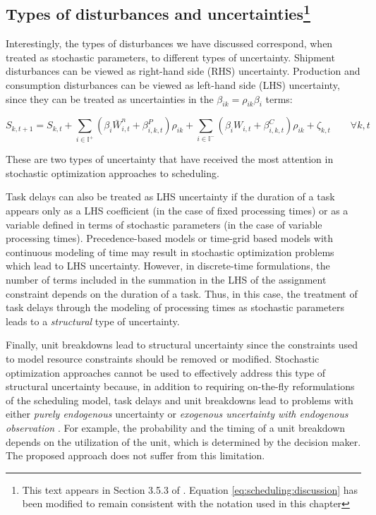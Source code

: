 \subsection{Types of disturbances and uncertainties\footnote{This text appears in Section 3.5.3 of
  \citet{subramanian:maravelias:rawlings:2012}. Equation
  \eqref{eq:scheduling:discussion} has been modified to remain
  consistent with the notation used in this chapter}}

Interestingly, the types of disturbances we have discussed
correspond, when treated as stochastic parameters, to different types
of uncertainty. Shipment disturbances can be viewed as right-hand side
(RHS) uncertainty. Production and consumption disturbances can be
viewed as left-hand side (LHS) uncertainty, since they can be treated
as uncertainties in the $\beta_{ik} = \rho_{ik}\beta_i$ terms:

\begin{equation}
\label{eq:scheduling:discussion}
S_{k,t+1} = S_{k,t}+ \sum_{i \in
  \mathbb{I}^+}(\beta_{i}\bar{W}_{i,t}^{n}+\beta_{i,k,t}^P)\rho_{ik}
+\sum_{i \in
  \mathbb{I}^-}(\beta_{i}{W}_{i,t}+\beta_{i,k,t}^C)\rho_{ik} +
\zeta_{k,t} \qquad \forall k,t
\end{equation}

These are two types of uncertainty that have received the most
attention in stochastic optimization approaches to scheduling.

Task delays can also be treated as LHS uncertainty if the duration of
a task appears only as a LHS coefficient (in the case of fixed
processing times) or as a variable defined in terms of stochastic
parameters (in the case of variable processing
times). Precedence-based models or time-grid based models with
continuous modeling of time may result in stochastic optimization
problems which lead to LHS uncertainty. However, in discrete-time
formulations, the number of terms included in the summation in the LHS
of the assignment constraint depends on the duration of a task. Thus,
in this case, the treatment of task delays through the modeling of
processing times as stochastic parameters leads to a
{\emph{structural}} type of uncertainty.

Finally, unit breakdowns lead to structural uncertainty since the
constraints used to model resource constraints should be removed or
modified. Stochastic optimization approaches cannot be used to
effectively address this type of structural uncertainty because, in
addition to requiring on-the-fly reformulations of the scheduling
model, task delays and unit breakdowns lead to problems with either
{\emph{purely endogenous}} uncertainty or {\emph{exogenous uncertainty
    with endogenous observation}} \citep{colvin:maravelias:2008,colvin:maravelias:2010,goel:grossmann:2006}. For example, the
  probability and the timing of a unit breakdown depends on the
  utilization of the unit, which is determined by the decision
  maker. The proposed approach does not suffer from this limitation. 

